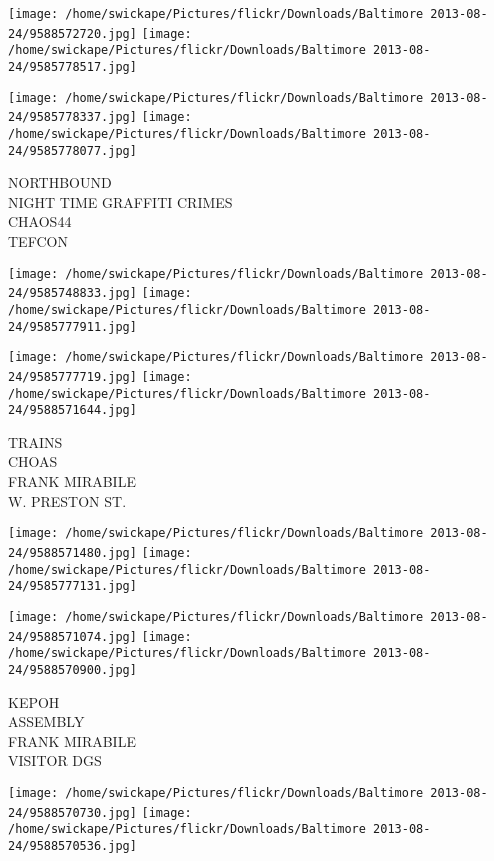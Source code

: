 \documentclass[10pt,letterpaper]{article}
\begin{document}
\texttt{[image: /home/swickape/Pictures/flickr/Downloads/Baltimore 2013-08-24/9588572720.jpg]}
\texttt{[image: /home/swickape/Pictures/flickr/Downloads/Baltimore 2013-08-24/9585778517.jpg]}

\texttt{[image: /home/swickape/Pictures/flickr/Downloads/Baltimore 2013-08-24/9585778337.jpg]}
\texttt{[image: /home/swickape/Pictures/flickr/Downloads/Baltimore 2013-08-24/9585778077.jpg]}

NORTHBOUND\\
NIGHT TIME GRAFFITI CRIMES\\
CHAOS44\\
TEFCON\\
\pagebreak

\texttt{[image: /home/swickape/Pictures/flickr/Downloads/Baltimore 2013-08-24/9585748833.jpg]}
\texttt{[image: /home/swickape/Pictures/flickr/Downloads/Baltimore 2013-08-24/9585777911.jpg]}

\texttt{[image: /home/swickape/Pictures/flickr/Downloads/Baltimore 2013-08-24/9585777719.jpg]}
\texttt{[image: /home/swickape/Pictures/flickr/Downloads/Baltimore 2013-08-24/9588571644.jpg]}

TRAINS\\
CHOAS\\
FRANK MIRABILE\\
W. PRESTON ST.\\
\pagebreak

\texttt{[image: /home/swickape/Pictures/flickr/Downloads/Baltimore 2013-08-24/9588571480.jpg]}
\texttt{[image: /home/swickape/Pictures/flickr/Downloads/Baltimore 2013-08-24/9585777131.jpg]}

\texttt{[image: /home/swickape/Pictures/flickr/Downloads/Baltimore 2013-08-24/9588571074.jpg]}
\texttt{[image: /home/swickape/Pictures/flickr/Downloads/Baltimore 2013-08-24/9588570900.jpg]}

KEPOH\\
ASSEMBLY\\
FRANK MIRABILE\\
VISITOR DGS\\
\pagebreak

\texttt{[image: /home/swickape/Pictures/flickr/Downloads/Baltimore 2013-08-24/9588570730.jpg]}
\texttt{[image: /home/swickape/Pictures/flickr/Downloads/Baltimore 2013-08-24/9588570536.jpg]}
\end{document}
